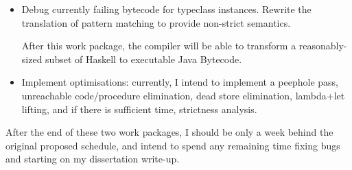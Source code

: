 \documentclass[11pt]{article}
\begin{document}
\begin{itemize}
\item
{

    Debug currently failing bytecode for typeclass instances. Rewrite the translation of pattern matching to provide
    non-strict semantics.

    After this work package, the compiler will be able to transform a reasonably-sized subset of Haskell to executable
    Java Bytecode.
}
\item
{

    Implement optimisations: currently, I intend to implement a peephole pass, unreachable code/procedure elimination,
    dead store elimination, lambda+let lifting, and if there is sufficient time, strictness analysis.
}
\end{itemize}

After the end of these two work packages, I should be only a week behind the original proposed schedule, and intend to
spend any remaining time fixing bugs and starting on my dissertation write-up.
\end{document}
